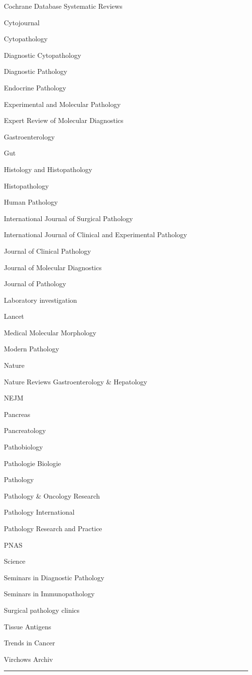 \documentclass[]{article}
\begin{document}
Cochrane Database Systematic Reviews

Cytojournal

Cytopathology

Diagnostic Cytopathology

Diagnostic Pathology

Endocrine Pathology

Experimental and Molecular Pathology

Expert Review of Molecular Diagnostics

Gastroenterology

Gut

Histology and Histopathology

Histopathology

Human Pathology

International Journal of Surgical Pathology

International Journal of Clinical and Experimental Pathology

Journal of Clinical Pathology

Journal of Molecular Diagnostics

Journal of Pathology

Laboratory investigation

Lancet

Medical Molecular Morphology

Modern Pathology

Nature

Nature Reviews Gastroenterology \& Hepatology

NEJM

Pancreas

Pancreatology

Pathobiology

Pathologie Biologie

Pathology

Pathology \& Oncology Research

Pathology International

Pathology Research and Practice

PNAS

Science

Seminars in Diagnostic Pathology

Seminars in Immunopathology

Surgical pathology clinics

Tissue Antigens

Trends in Cancer

Virchows Archiv

\begin{center}\rule{0.5\linewidth}{\linethickness}\end{center}
\end{document}
